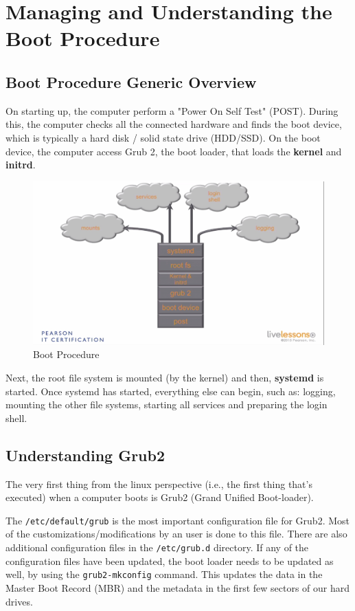 \chapter{Managing and Understanding the Boot Procedure}
\section{Boot Procedure Generic Overview}
On starting up, the computer perform a "Power On Self Test" (POST). During this, the computer checks all the connected hardware and finds the boot device, which is typically a hard disk / solid state drive (HDD/SSD). On the boot device, the computer access Grub 2, the boot loader, that loads the \textbf{kernel} and \textbf{initrd}. 

\begin{figure}[H]
	\centering
	\includegraphics[width=0.9\linewidth]{RHCSA/Mod3/chapters/3.19.a}
	\caption{Boot Procedure}
	\label{fig:3 Boot Procedure}
\end{figure}

Next, the root file system is mounted (by the kernel) and then, \textbf{systemd} is started. Once systemd has started, everything else can begin, such as: logging, mounting the other file systems, starting all services and preparing the login shell. 

\section{Understanding Grub2}
The very first thing from the linux perspective (i.e., the first thing that's executed) when a computer boots is Grub2 (Grand Unified Boot-loader). 

The \verb|/etc/default/grub| is the most important configuration file for Grub2. Most of the customizations/modifications by an user is done to this file. There are also additional configuration files in the \verb|/etc/grub.d| directory. If any of the configuration files have been updated, the boot loader needs to be updated as well, by using the \verb|grub2-mkconfig| command. This updates the data in the Master Boot Record (MBR) and the metadata in the first few sectors of our hard drives. 

